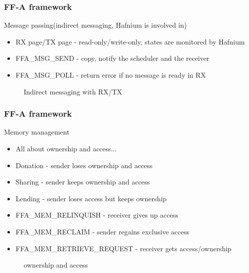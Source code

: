 \documentclass{beamer}
\begin{document}
\begin{frame}
  \frametitle{FF-A framework}
  Message passing(indirect messaging, Hafnium is involved in)
  \begin{itemize}
    \item RX page/TX page - read-only/write-only, states are monitored by Hafnium
    \item FFA\_MSG\_SEND - copy, notify the scheduler and the receiver
    \item FFA\_MSG\_POLL - return error if no message is ready in RX
  \end{itemize}
  \begin{figure}
    
        \caption{Indirect messaging with RX/TX}
      \end{figure}
\end{frame}

\begin{frame}
  \frametitle{FF-A framework}
  Memory management
  \begin{itemize}
    \item All about ownership and access...
    \item Donation - sender loses ownership and access
    \item Sharing - sender keeps ownership and access
    \item Lending - sender loses access but keeps ownership
    \item FFA\_MEM\_RELINQUISH - receiver gives up access
    \item FFA\_MEM\_RECLAIM - sender regains exclusive access
    \item FFA\_MEM\_RETRIEVE\_REQUEST - receiver gets access/ownership
  \end{itemize}
  \begin{figure}
    
        \caption{ownership and access}
      \end{figure}
    \end{frame}
\end{document}
